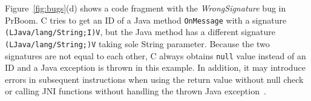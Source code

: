 Figure~\ref{fig:bugs}(d) shows a code fragment with the {\it WrongSignature}
bug in PrBoom. C tries to get an ID of a Java method {\tt OnMessage} with a
signature \texttt{(LJava/lang/String;I)V}, but the Java method has a different
signature \texttt{(LJava/lang/String;)V} taking sole String parameter. Because
the two signatures are not equal to each other, C always obtains {\tt null}
value instead of an ID and a Java exception is thrown in this example. In
addition, it may introduce errors in subsequent instructions when using the
return value without null check or calling JNI functions without handling the
thrown Java exception~\cite{jniexcept}.



%


